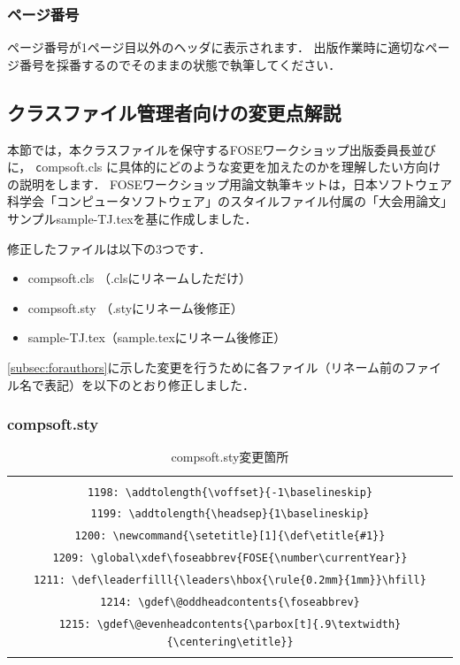 \documentclass[T,J]{fose} %
\begin{document}
\subsubsection{ページ番号}
ページ番号が1ページ目以外のヘッダに表示されます．
出版作業時に適切なページ番号を採番するのでそのままの状態で執筆してください．


\subsection{クラスファイル管理者向けの変更点解説} \label{sec:differences}
本節では，本クラスファイルを保守するFOSEワークショップ出版委員長並びに， {\texttt compsoft.cls} に具体的にどのような変更を加えたのかを理解したい方向けの説明をします．
FOSEワークショップ用論文執筆キットは，日本ソフトウェア科学会「コンピュータソフトウェア」のスタイルファイル付属の「大会用論文」サンプルsample-TJ.texを基に作成しました．

修正したファイルは以下の3つです．
\begin{itemize}
	\item compsoft.cls （\MakeLowercase{\foseabbrev}.clsにリネームしただけ）
	\item compsoft.sty （\MakeLowercase{\foseabbrev}.styにリネーム後修正）
	\item sample-TJ.tex（sample.texにリネーム後修正）
\end{itemize}

\ref{subsec:forauthors}に示した変更を行うために各ファイル（リネーム前のファイル名で表記）を以下のとおり修正しました．


\subsubsection*{compsoft.sty}
\begin{table}[t]
\caption{compsoft.sty変更箇所}
\label{table:change1}
 	\begin{tabular}{c}
		\begin{tabularx}{47zw}{X}
		\hline
		\verb|1196: \def\leaderfilll{\leaders\hbox{\rule{0.2mm}{1mm}}\hfill}| \\
		\verb|1198: \addtolength{\voffset}{-1\baselineskip}| \\
		\verb|1199: \addtolength{\headsep}{1\baselineskip}| \\
		\verb|1200: \newcommand{\setetitle}[1]{\def\etitle{#1}}| \\
		\verb|1209: \global\xdef\foseabbrev{FOSE{\number\currentYear}}| \\
		\verb|1211: \def\leaderfilll{\leaders\hbox{\rule{0.2mm}{1mm}}\hfill}| \\
		\verb|1214: \gdef\@oddheadcontents{\foseabbrev}| \\
		\verb|1215: \gdef\@evenheadcontents{\parbox[t]{.9\textwidth}{\centering\etitle}}| \\
		\hline
		\end{tabularx}
	\end{tabular}
\end{table}
\end{document}
